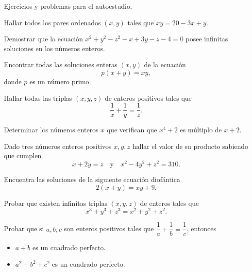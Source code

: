 Ejercicios y problemas para el autoestudio.

\begin{exercise}
    Hallar todos los pares ordenados $(x,y)$ tales que $xy = 20 - 3x + y$.
\end{exercise}

\begin{exercise}
    Demostrar que la ecuación $x^2 + y^2 - z^2 - x + 3y - z - 4 = 0$ posee infinitas soluciones en los números enteros.
\end{exercise}

\begin{exercise}
    Encontrar todas las soluciones enteras $(x,y)$ de la ecuación
    \[
        p(x + y) = xy,
    \]
    donde $p$ es un número primo.
\end{exercise}

\begin{exercise}
    Hallar todas las triplas $(x,y,z)$ de enteros positivos tales que
    \[
        \frac{1}{x} + \frac{1}{y} = \frac{1}{z}.
    \]
\end{exercise}

\begin{exercise}
    Determinar los números enteros $x$ que verifican que $x^4 + 2$ es múltiplo de $x + 2$.
\end{exercise}

\begin{exercise}
    Dado tres números enteros positivos $x,y,z$ hallar el valor de su producto sabiendo que cumplen
    \[
        x + 2y = z \quad \text{y} \quad x^2 - 4y^2 + z^2 = 310.
    \]
\end{exercise}

\begin{exercise}
    Encuentra las soluciones de la siguiente ecuación diofántica
    \[
        2(x + y) = xy + 9.
    \]
\end{exercise}

\begin{exercise}
    Probar que existen infinitas triplas $(x,y,z)$ de enteros tales que
    \[
        x^3 + y^3 + z^3 = x^2 + y^2 + z^2.
    \]
\end{exercise}

\begin{problem}
    Probar que si $a,b,c$ son enteros positivos tales que $\dfrac{1}{a} + \dfrac{1}{b} = \dfrac{1}{c}$, entonces
    \begin{itemize}
        \item $a + b$ es un cuadrado perfecto.
        \item $a^2 + b^2 + c^2$ es un cuadrado perfecto.
    \end{itemize}
\end{problem}



